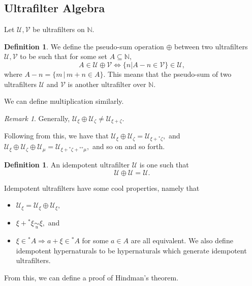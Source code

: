 \documentclass[12pt]{amsart}
\newcommand{\stt}{{}^*}
\newcommand{\NN}{\mathbb{N}}
\newcommand{\mcU}{\mathcal{U}}
\theoremstyle{plain}
\theoremstyle{definition}
\newtheorem{defn}[thm]{Definition}
\theoremstyle{remark}
\newtheorem{rem}[thm]{Remark}
\theoremstyle{theorem}
\numberwithin{equation}{section}
\numberwithin{thm}{section}
\begin{document}
\subsection{Ultrafilter Algebra} Let $\mcU, \mathcal{V}$ be ultrafilters on $\NN.$ 
\begin{defn}
We define the pseudo-sum operation $\oplus$ between two ultrafilters $\mcU, \mathcal{V}$ to be such that for some set $A \subseteq \NN,$
\[A \in \mcU \oplus \mathcal{V} \iff \{n | A - n \in \mathcal{V} \} \in \mcU, \]
where $A - n = \{ m \, | \, m+n \in A\}.$ This means that the pseudo-sum of two ultrafilters $\mcU$ and $\mathcal{V}$ is another ultrafilter over $\NN.$
\end{defn}
We can define multiplication similarly.
\begin{rem}
Generally, $\mcU_\xi \oplus \mcU_\zeta \neq \mcU_{\xi + \zeta}.$
\end{rem}
Following from this, we have that $\mcU_\xi \oplus \mcU_\zeta = \mcU_{\xi + \stt \zeta},$ and $\mcU_\xi \oplus \mcU_\zeta \oplus \mcU_{\mu} = \mcU_{\xi + \stt \zeta + \stt \stt \mu},$ and so on and so forth. 
\begin{defn}
An idempotent ultrafilter $\mcU$ is one such that \[\mcU \oplus \mcU = \mcU. \]
\end{defn}
Idempotent ultrafilters have some cool properties, namely that
\begin{itemize}
    \item $\mcU_\xi = \mcU_\xi \oplus \mcU_\xi,$
    \item $\xi + \stt \xi \underset{u}{\sim} \xi,$ and
    \item $\xi \in \stt A \Longrightarrow a + \xi \in \stt A$ for some $a \in A$
are all equivalent. We also define idempotent hypernaturals to be hypernaturals which generate idempotent ultrafilters. 
\end{itemize}
From this, we can define a proof of Hindman's theorem. 
\end{document}
